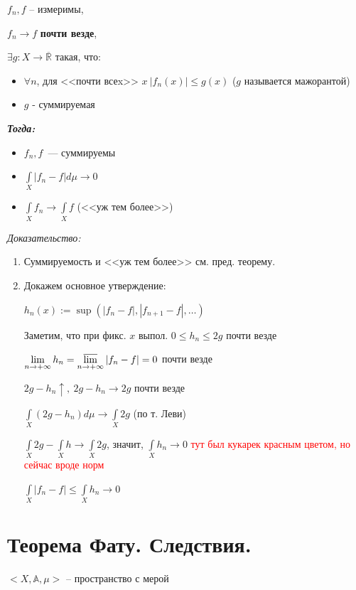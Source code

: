 \documentclass[paper=a4, fontsize=17pt]{article}
\begin{document}
$f_n, f$ -- измеримы,

$f_n \rightarrow f$ \textbf{почти везде},

$\exists g : X \rightarrow \overline{\mathds{R}}$ такая, что:
\begin{itemize}
\item
$\forall n$,  для <<почти всеx>> $x ~ |f_n(x)| \leq g(x)$ ($g$ называется мажорантой)
\item
$g$ - суммируемая
\end{itemize}

\emph{\textbf{Тогда:}}
\begin{itemize}
    \item $f_n, f$~--- суммируемы
    \item $\int\limits_{X} |f_n - f| d\mu \rightarrow 0$
    \item $\int\limits_{X} f_n \rightarrow \int\limits_{X} f$ (<<уж тем более>>)
\end{itemize}

\emph{Доказательство:}

\begin{enumerate}
	\item Суммируемость и <<уж тем более>> см. пред. теорему.

	\item Докажем основное утверждение:

	$ h_n(x) := \sup(|f_n - f|, |f_{n+1} - f|, \dots) $

	Заметим, что при фикс. $ x $ выпол. $ 0 \leq h_n \leq 2g $ почти везде

	$ \lim\limits_{n \rightarrow +\infty} h_n =
	\varlimsup\limits_{n \rightarrow +\infty} |f_n - f| = 0 $ почти везде

	$ 2g - h_n \uparrow , ~ 2g - h_n \rightarrow 2g$ почти везде

	$ \int\limits_{X}(2g - h_n) d\mu \rightarrow \int\limits_{X} 2g $
	(по т. Леви)

	$ \int\limits_{X} 2g - \int\limits_{X} h \to \int\limits_{X} 2g$, значит, $\int\limits_{X} h_n \rightarrow 0 $  
    \textcolor{red}{тут был кукарек красным цветом, но сейчас вроде норм}

	$ \int\limits_{X} |f_n - f| \leq \int\limits_{X} h_n \rightarrow 0 $
\end{enumerate}

\section{Теорема Фату. Следствия.}
$<X, \mathds{A}, \mu>$ -- пространство с мерой
\end{document}

